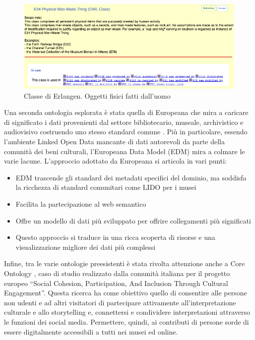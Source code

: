 \documentclass[12pt]{article}
\begin{document}
\begin{figure}[!hb]
   \centering
   \includegraphics[scale=0.5]{fig/classe di CIDOC.png}
   \caption{Classe di Erlangen. Oggetti fisici fatti dall'uomo}\label{fig:picture}
\end{figure}

Una seconda ontologia esplorata è stata quella di Europeana che mira a caricare di significato i dati provenienti dal settore bibliotecario, museale, archivistico e audiovisivo costruendo uno stesso standard comune \parencite{europeana}. Più in particolare, essendo l’ambiente Linked Open Data mancante di dati autorevoli da parte della comunità dei beni culturali, l’Europeana Data Model (EDM) mira a colmare le varie lacune. 
\newpage
L’approccio adottato da Europeana si articola in vari punti:

\begin{itemize}
 \item EDM trascende gli standard dei metadati specifici del dominio, ma soddisfa la ricchezza di standard comunitari come LIDO per i musei 
 \item Facilita la partecipazione al web semantico
 \item Offre un modello di dati più sviluppato per offrire collegamenti più significati
 \item Questo approccio si traduce in una ricca scoperta di risorse e una visualizzazione migliore dei dati più complessi
\end{itemize} 
 
Infine, tra le varie ontologie preesistenti è stata rivolta attenzione anche a Core Ontology \parencite{core}, caso di studio realizzato dalla comunità italiana per il progetto europeo “Social Cohesion, Participation, And Inclusion Through Cultural Engagement”. Questa ricerca ha come obiettivo quello di consentire alle persone non udenti e ad altri visitatori di partecipare attivamente all’interpretazione culturale e allo storytelling e, connettersi e condividere interpretazioni attraverso le funzioni dei social media. Permettere, quindi, ai contributi di persone sorde di essere digitalmente accessibili a tutti nei musei ed online.
\end{document}
